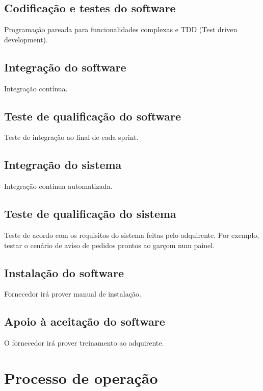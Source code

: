 \subsection{Codificação e testes do software}

Programação pareada para funcionalidades complexas e TDD (Test driven development).

\subsection{Integração do software}

Integração contínua.

\subsection{Teste de qualificação do software}

Teste de integração ao final de cada sprint.

\subsection{Integração do sistema}

Integração contínua automatizada.

\subsection{Teste de qualificação do sistema}

Teste de acordo com os requisitos do sistema feitas pelo adquirente. Por exemplo, testar o cenário de aviso de pedidos prontos ao garçom num painel.

\subsection{Instalação do software}

Fornecedor irá prover manual de instalação.

\subsection{Apoio à aceitação do software}

O fornecedor irá prover treinamento ao adquirente.


\section{Processo de operação}
\label{sec:operacao}

